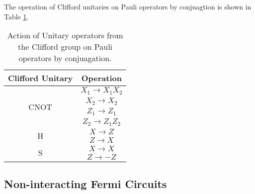 The operation of Clifford unitaries on Pauli operators by conjuagtion is shown in Table \ref{table:1}.
\begin{table}[h!]
    \centering
    \begin{tabular}{ ||c|c|| }
        \hline
        Clifford Unitary        & Operation        \\
        \hline\hline
        \multirow{4}{3em}{CNOT} & $X_1 \to X_1X_2$ \\
                                & $X_2 \to X_2$    \\
                                & $Z_1 \to Z_1$    \\
                                & $Z_2 \to Z_1Z_2$ \\
        \hline
        \multirow{2}{1em}{H}    & $X \to Z$        \\
                                & $Z\to X$         \\
        \hline
        \multirow{2}{0.9em}{S}  & $X \to X$        \\
                                & $Z \to -Z$       \\
        \hline
    \end{tabular}
    \caption{Action of Unitary operators from the Clifford group on Pauli operators by conjuagation.}
    \label{table:1}
\end{table}


\subsection{Non-interacting Fermi Circuits}
